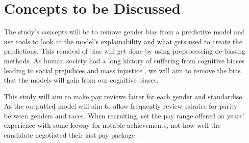 \documentclass{sigchi}
\begin{document}
\section{Concepts to be Discussed}

The study's concepts will be to remove gender bias from a predictive model and use tools to look at the model's explainability and what gets used to create the predictions. This removal of bias will get done by using preprocessing de-biasing methods.  As human society had a long history of suffering from cognitive biases leading to social prejudices and mass injustice \cite{sen2020towards}, we will aim to remove the bias that the models will gain from our cognitive biases.

This study will aim to make pay reviews fairer for each gender and standardise.  As the outputted model will aim to allow frequently review salaries for parity between genders and races. When recruiting, set the pay range offered on years' experience with some leeway for notable achievements, not how well the candidate negotiated their last pay package \cite{sage_work_diversity}.


\newpage
\balance{}



\end{document}
